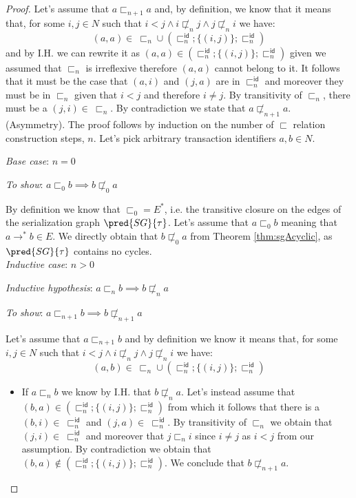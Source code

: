 \begin{thm}
\begin{proof}
{	Let's assume that $a \sqsubset_{n+1} a$ and, by definition, we know that it means that, for some $i, j \in N$ such that $i < j \land i \not\sqsubset_n j \land j \not\sqsubset_n i$ we have:
	\[
		(a, a) \in\ \sqsubset_n \cup \left( \sqsubset_n^\mathsf{id} ; \{ (i, j) \} ; \sqsubset_n ^\mathsf{id} \right)
	\]
	and by I.H. we can rewrite it as $(a, a) \in \left( \sqsubset_n^\mathsf{id} ; \{ (i, j) \} ; \sqsubset_n ^\mathsf{id} \right)$ given we assumed that $\sqsubset_n$ is irreflexive therefore $(a, a)$ cannot belong to it. It follows that it must be the case that $(a, i)$ and $(j, a)$ are in $\sqsubset_n^\mathsf{id}$ and moreover they must be in $\sqsubset_n$ given that $i < j$ and therefore $i \neq j$. By transitivity of $\sqsubset_n$, there must be a $(j, i) \in\ \sqsubset_n$. By contradiction we state that $a \not\sqsubset_{n+1} a$. \\
	}
	\indline
	(Asymmetry). The proof follows by induction on the number of $\sqsubset$ relation construction steps, $n$. Let's pick arbitrary transaction identifiers $a, b \in N$.
	
	{\parindent0pt
	\textit{Base case}: $n = 0$
	
	\textit{To show}: $a \sqsubset_0 b \implies b \not\sqsubset_0 a$
	
	By definition we know that $\sqsubset_0 = E^*$, i.e. the transitive closure on the edges of the serialization graph $\pred{SG}{\tau}$. Let's assume that $a \sqsubset_0 b$ meaning that $a \rightarrow^* b \in E$. We directly obtain that $b \not\sqsubset_0 a$ from Theorem \ref{thm:sgAcyclic}, as $\pred{SG}{\tau}$ contains no cycles. \\
	
	\textit{Inductive case}: $n > 0$
	
	\textit{Inductive hypothesis}: $a \sqsubset_n b \implies b \not\sqsubset_n a$
	
	\textit{To show}: $a \sqsubset_{n + 1} b \implies b \not\sqsubset_{n + 1} a$
	
	Let's assume that $a \sqsubset_{n + 1} b$ and by definition we know it means that, for some $i, j \in N$ such that $i < j \land i \not\sqsubset_n j \land j \not\sqsubset_n i$ we have:
	\[
		(a, b) \in\ \sqsubset_n \cup \left( \sqsubset_n^\mathsf{id} ; \{ (i, j) \} ; \sqsubset_n ^\mathsf{id} \right)
	\]
	\begin{itemize}
		\item If $a \sqsubset_n b$ we know by I.H. that $b \not\sqsubset_n a$. Let's instead assume that $(b, a) \in \left( \sqsubset_n^\mathsf{id} ; \{ (i, j) \} ; \sqsubset_n ^\mathsf{id} \right)$ from which it follows that there is a $(b, i) \in\ \sqsubset_n^\mathsf{id}$ and $(j, a) \in\ \sqsubset_n^\mathsf{id}$. By transitivity of $\sqsubset_n$ we obtain that $(j, i) \in\ \sqsubset_n^\mathsf{id}$ and moreover that $j \sqsubset_n i$ since $i \neq j$ as $i < j$ from our assumption. By contradiction we obtain that $(b, a) \not\in \left( \sqsubset_n^\mathsf{id} ; \{ (i, j) \} ; \sqsubset_n ^\mathsf{id} \right)$. We conclude that $b \not\sqsubset_{n + 1} a$.
		

\end{itemize}}
\end{proof}
\end{thm}
